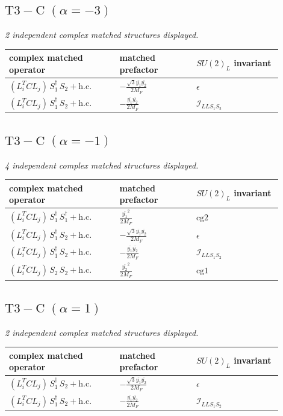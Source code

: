 \documentclass[9pt]{article}
\begin{document}
\subsection*{$ \mathrm{T3-C}\;(\alpha=-3) $}
\textit{2 independent complex matched structures displayed. }
\begin{longtable}{@{}p{0.36\linewidth}p{0.25\linewidth}p{0.29\linewidth}@{}}
\toprule
complex matched operator & matched prefactor & $SU(2)_L$ invariant \\
\midrule
$ (L_i^T C L_j)\,S_1^\dagger\,S_2+\mathrm{h.c.} $ & $ - \frac{\sqrt{3} \overline{y_{1}} \overline{y_{2}}}{2 M_F} $ & $ \epsilon $ \\
$ (L_i^T C L_j)\,S_1^\dagger\,S_2+\mathrm{h.c.} $ & $ - \frac{\overline{y_{1}} \overline{y_{2}}}{2 M_F} $ & $ \mathcal{I}_{LLS_1S_2} $ \\
\bottomrule
\end{longtable}
\subsection*{$ \mathrm{T3-C}\;(\alpha=-1) $}
\textit{4 independent complex matched structures displayed. }
\begin{longtable}{@{}p{0.36\linewidth}p{0.25\linewidth}p{0.29\linewidth}@{}}
\toprule
complex matched operator & matched prefactor & $SU(2)_L$ invariant \\
\midrule
$ (L_i^T C L_j)\,S_1^\dagger\,S_1^\dagger+\mathrm{h.c.} $ & $ \frac{\overline{y_{1}}^{2}}{2 M_F} $ & $ \mathrm{cg2} $ \\
$ (L_i^T C L_j)\,S_1^\dagger\,S_2+\mathrm{h.c.} $ & $ - \frac{\sqrt{3} \overline{y_{1}} \overline{y_{2}}}{2 M_F} $ & $ \epsilon $ \\
$ (L_i^T C L_j)\,S_1^\dagger\,S_2+\mathrm{h.c.} $ & $ - \frac{\overline{y_{1}} \overline{y_{2}}}{2 M_F} $ & $ \mathcal{I}_{LLS_1S_2} $ \\
$ (L_i^T C L_j)\,S_2\,S_2+\mathrm{h.c.} $ & $ \frac{\overline{y_{2}}^{2}}{2 M_F} $ & $ \mathrm{cg1} $ \\
\bottomrule
\end{longtable}
\subsection*{$ \mathrm{T3-C}\;(\alpha=1) $}
\textit{2 independent complex matched structures displayed. }
\begin{longtable}{@{}p{0.36\linewidth}p{0.25\linewidth}p{0.29\linewidth}@{}}
\toprule
complex matched operator & matched prefactor & $SU(2)_L$ invariant \\
\midrule
$ (L_i^T C L_j)\,S_1^\dagger\,S_2+\mathrm{h.c.} $ & $ - \frac{\sqrt{3} \overline{y_{1}} \overline{y_{2}}}{2 M_F} $ & $ \epsilon $ \\
$ (L_i^T C L_j)\,S_1^\dagger\,S_2+\mathrm{h.c.} $ & $ - \frac{\overline{y_{1}} \overline{y_{2}}}{2 M_F} $ & $ \mathcal{I}_{LLS_1S_2} $ \\
\bottomrule
\end{longtable}
\end{document}
